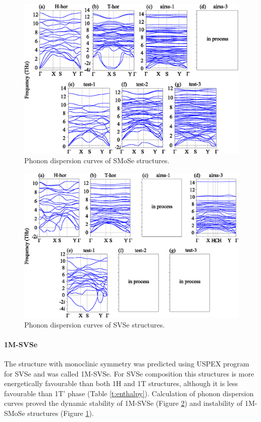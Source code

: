 \documentclass[a4paperm]{article}
\begin{document}
\begin{figure}[H]
	\includegraphics[width=\textwidth]{phon_smose.eps}
	\caption{Phonon dispersion curves of SMoSe structures.}
	\label{phon_smose}
\end{figure}

\begin{figure}[H]
	\includegraphics[width=\textwidth]{phon_svse.eps}
	\caption{Phonon dispersion curves of SVSe structures.}
	\label{phon_svse}
\end{figure}






\paragraph{1M-SVSe}

The structure with monoclinic symmetry was predicted using USPEX program for SVSe and was called 1M-SVSe. 
For SVSe composition this structures is more energetically favourable than both 1H and 1T structures, although it is less favourable than 1T' phase (Table \ref{t:enthalpy}).
Calculation of phonon dispersion curves proved the dynamic stability of 1M-SVSe (Figure \ref{phon_svse}) and instability of 1M-SMoSe structures (Figure \ref{phon_smose}).
\end{document}
